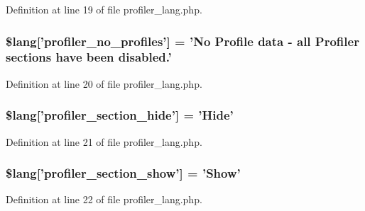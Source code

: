 Definition at line 19 of file profiler\-\_\-lang.\-php.

\hypertarget{profiler__lang_8php_aabea841eed12fa8271f13656fa7d5457}{
\subsubsection[{\$lang}]{\setlength{\rightskip}{0pt plus 5cm}\$lang\mbox{[}'profiler\-\_\-no\-\_\-profiles'\mbox{]} = 'No Profile data -\/ all Profiler sections have been disabled.'}}\label{profiler__lang_8php_aabea841eed12fa8271f13656fa7d5457}


Definition at line 20 of file profiler\-\_\-lang.\-php.

\hypertarget{profiler__lang_8php_a137158ebe1d58bd53bbbb4594f2bc0ed}{
\subsubsection[{\$lang}]{\setlength{\rightskip}{0pt plus 5cm}\$lang\mbox{[}'profiler\-\_\-section\-\_\-hide'\mbox{]} = 'Hide'}}\label{profiler__lang_8php_a137158ebe1d58bd53bbbb4594f2bc0ed}


Definition at line 21 of file profiler\-\_\-lang.\-php.

\hypertarget{profiler__lang_8php_a3e3b1984f57780efbdaf6d01dac31f3c}{
\subsubsection[{\$lang}]{\setlength{\rightskip}{0pt plus 5cm}\$lang\mbox{[}'profiler\-\_\-section\-\_\-show'\mbox{]} = 'Show'}}\label{profiler__lang_8php_a3e3b1984f57780efbdaf6d01dac31f3c}


Definition at line 22 of file profiler\-\_\-lang.\-php.

